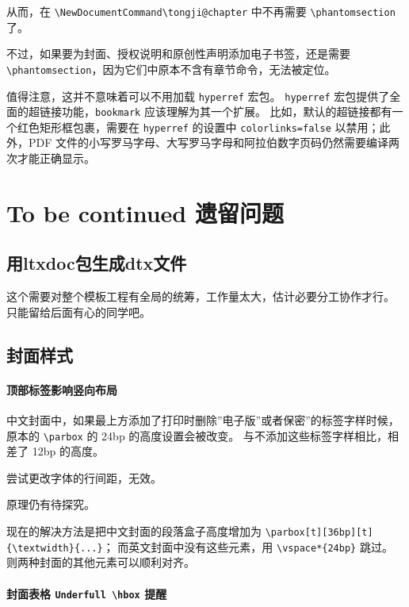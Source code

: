 \documentclass[../Main/thesis.tex]{subfiles}
\begin{document}
从而，在
\texttt{\textbackslash{}NewDocumentCommand\textbackslash{}tongji@chapter}
中不再需要 \texttt{\textbackslash{}phantomsection} 了。

不过，如果要为封面、授权说明和原创性声明添加电子书签，还是需要
\texttt{\textbackslash{}phantomsection}，因为它们中原本不含有章节命令，无法被定位。

值得注意，这并不意味着可以不用加载 \texttt{hyperref} 宏包。
\texttt{hyperref} 宏包提供了全面的超链接功能，\texttt{bookmark}
应该理解为其一个扩展。 比如，默认的超链接都有一个红色矩形框包裹，需要在
\texttt{hyperref} 的设置中 \texttt{colorlinks=false} 以禁用；此外，PDF
文件的小写罗马字母、大写罗马字母和阿拉伯数字页码仍然需要编译两次才能正确显示。

\section{To be continued
遗留问题}

\subsection{用ltxdoc包生成dtx文件}

这个需要对整个模板工程有全局的统筹，工作量太大，估计必要分工协作才行。
只能留给后面有心的同学吧。

\subsection{封面样式}

\paragraph{顶部标签影响竖向布局}


中文封面中，如果最上方添加了打印时删除''电子版''或者保密''的标签字样时候，原本的
\texttt{\textbackslash{}parbox} 的 24bp 的高度设置会被改变。
与不添加这些标签字样相比，相差了 12bp 的高度。

尝试更改字体的行间距，无效。

原理仍有待探究。

现在的解决方法是把中文封面的段落盒子高度增加为
\texttt{\textbackslash{}parbox[t][36bp][t]\{\textbackslash{}textwidth\}\{...\}}；
而英文封面中没有这些元素，用 \texttt{\textbackslash{}vspace*\{24bp\}}
跳过。 则两种封面的其他元素可以顺利对齐。

\paragraph{封面表格 \texttt{Underfull\ \textbackslash{}hbox} 提醒}
\end{document}
